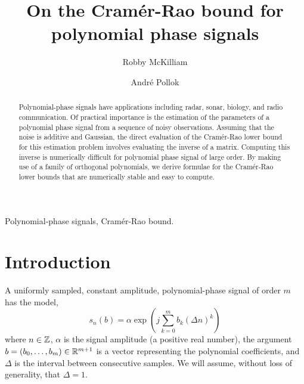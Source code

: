 \documentclass[5p]{elsarticle}
\begin{document}
\begin{frontmatter}

\title{On the Cram\'{e}r-Rao bound for polynomial phase signals}

\author{Robby McKilliam} 
\author{Andr\'{e} Pollok}
\address{Institute for Telecommunications Research, The University of South Australia, SA, 5095}
 


\begin{abstract}
Polynomial-phase signals have applications including radar, sonar, biology, and radio communication.  Of practical importance is the estimation of the parameters of a polynomial phase signal from a sequence of noisy observations.  Assuming that the noise is additive and Gaussian, the direct evaluation of the Cram\'{e}r-Rao lower bound for this estimation problem involves evaluating the inverse of a matrix.  Computing this inverse is numerically difficult for polynomial phase signal of large order.  By making use of a family of orthogonal polynomials, we derive formulae for the Cram\'{e}r-Rao lower bounds that are numerically stable and easy to compute.
\end{abstract}

\begin{keyword}
Polynomial-phase signals, Cram\'{e}r-Rao bound.
\end{keyword}


\end{frontmatter}

\section{Introduction}

A uniformly sampled, constant amplitude, polynomial-phase signal of order $m$ has the model,
\begin{equation}\label{eq:polyestfunction}
s_n(b) = \alpha \exp\left( j \sum_{k = 0}^{m}{b_k (\Delta n)^k}\right)
\end{equation}
where $n \in {\mathbb Z}$, $\alpha$ is the signal amplitude (a positive real number), the argument $b=(b_0, \dots, b_m)\in{\mathbb R}^{m+1}$ is a vector representing the polynomial coefficients,  and $\Delta$ is the interval between consecutive samples.  We will assume, without loss of generality, that $\Delta = 1$.
\end{document}
